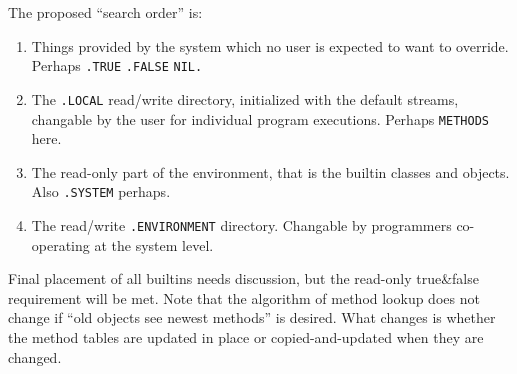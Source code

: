 The proposed ``search order'' is:

\begin{enumerate}
\def\labelenumi{\arabic{enumi}.}
\item
  Things provided by the system which no user is expected to want to
  override. Perhaps \texttt{.TRUE} \texttt{.FALSE} \texttt{NIL.}
\item
  The \texttt{.LOCAL} read/write directory, initialized with the default
  streams, changable by the user for individual program executions.
  Perhaps \texttt{METHODS} here.
\item
  The read-only part of the environment, that is the builtin classes and
  objects. Also \texttt{.SYSTEM} perhaps.
\item
  The read/write \texttt{.ENVIRONMENT} directory. Changable by
  programmers co-operating at the system level.
\end{enumerate}

Final placement of all builtins needs discussion, but the read-only
true\&false requirement will be met. Note that the algorithm of method
lookup does not change if ``old objects see newest methods'' is desired.
What changes is whether the method tables are updated in place or
copied-and-updated when they are changed.

